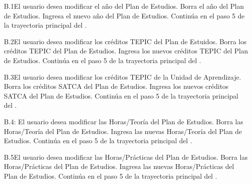 
\begin{UCtrayectoriaA}{B.1}{El usuario desea modificar el año del Plan de Estudios.}
	\UCpaso[\UCactor] Borra el año del Plan de Estudios.
	\UCpaso[\UCactor] Ingresa el nuevo año del Plan de Estudios.
	\UCpaso Continúa en el paso 5 de la trayectoria principal del .
\end{UCtrayectoriaA}


\begin{UCtrayectoriaA}{B.2}{El usuario desea modificar los créditos TEPIC del Plan de Estuidos.}
	\UCpaso[\UCactor] Borra los créditos TEPIC del Plan de Estudios.
	\UCpaso[\UCactor] Ingresa los nuevos créditos TEPIC del Plan de Estudios.
	\UCpaso Continúa en el paso 5 de la trayectoria principal del .
\end{UCtrayectoriaA}



\begin{UCtrayectoriaA}{B.3}{El usuario desea modificar los créditos TEPIC de la Unidad de Aprendizaje.}
	\UCpaso[\UCactor] Borra los créditos SATCA del Plan de Estudios.
	\UCpaso[\UCactor] Ingresa los nuevos créditos SATCA del Plan de Estudios.
	\UCpaso Continúa en el paso 5 de la trayectoria principal del .
\end{UCtrayectoriaA}



\begin{UCtrayectoriaA}{B.4}{: El usuario desea modificar las Horas/Teoría del Plan de Estudios.}
	\UCpaso[\UCactor] Borra las Horas/Teoría del Plan de Estudios.
	\UCpaso[\UCactor] Ingresa las nuevas Horas/Teoría del Plan de Estudios.
	\UCpaso Continúa en el paso 5 de la trayectoria principal del .
\end{UCtrayectoriaA}




\begin{UCtrayectoriaA}{B.5}{El usuario desea modificar las Horas/Prácticas del Plan de Estudios.}
	\UCpaso[\UCactor] Borra las Horas/Prácticas del Plan de Estudios.
	\UCpaso[\UCactor] Ingresa las nuevas Horas/Prácticas del Plan de Estudios.
	\UCpaso Continúa en el paso 5 de la trayectoria principal del .
\end{UCtrayectoriaA}



